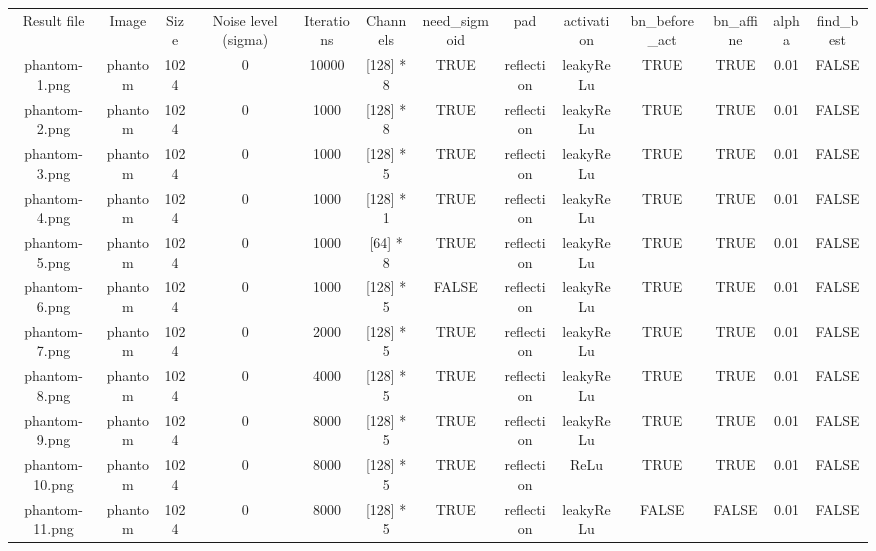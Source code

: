 \begin{tabular}{ccccccccccccc}
Result file    & Image   & Size & Noise level (sigma) & Iterations & Channels  & need_sigmoid & pad        & activation & bn_before_act & bn_affine & alpha & find_best   \\
phantom-1.png  & phantom & 1024 & 0                   & 10000      & [128] * 8 & TRUE         & reflection & leakyReLu  & TRUE          & TRUE      & 0.01  & FALSE       \\
phantom-2.png  & phantom & 1024 & 0                   & 1000       & [128] * 8 & TRUE         & reflection & leakyReLu  & TRUE          & TRUE      & 0.01  & FALSE       \\
phantom-3.png  & phantom & 1024 & 0                   & 1000       & [128] * 5 & TRUE         & reflection & leakyReLu  & TRUE          & TRUE      & 0.01  & FALSE       \\
phantom-4.png  & phantom & 1024 & 0                   & 1000       & [128] * 1 & TRUE         & reflection & leakyReLu  & TRUE          & TRUE      & 0.01  & FALSE       \\
phantom-5.png  & phantom & 1024 & 0                   & 1000       & [64] * 8  & TRUE         & reflection & leakyReLu  & TRUE          & TRUE      & 0.01  & FALSE       \\
phantom-6.png  & phantom & 1024 & 0                   & 1000       & [128] * 5 & FALSE        & reflection & leakyReLu  & TRUE          & TRUE      & 0.01  & FALSE       \\
phantom-7.png  & phantom & 1024 & 0                   & 2000       & [128] * 5 & TRUE         & reflection & leakyReLu  & TRUE          & TRUE      & 0.01  & FALSE       \\
phantom-8.png  & phantom & 1024 & 0                   & 4000       & [128] * 5 & TRUE         & reflection & leakyReLu  & TRUE          & TRUE      & 0.01  & FALSE       \\
phantom-9.png  & phantom & 1024 & 0                   & 8000       & [128] * 5 & TRUE         & reflection & leakyReLu  & TRUE          & TRUE      & 0.01  & FALSE       \\
phantom-10.png & phantom & 1024 & 0                   & 8000       & [128] * 5 & TRUE         & reflection & ReLu       & TRUE          & TRUE      & 0.01  & FALSE       \\
phantom-11.png & phantom & 1024 & 0                   & 8000       & [128] * 5 & TRUE         & reflection & leakyReLu  & FALSE         & FALSE     & 0.01  & FALSE       \\
\end{tabular}
